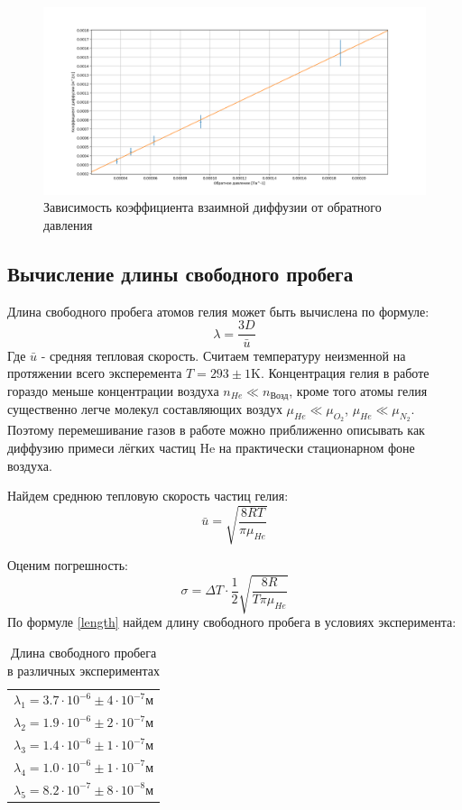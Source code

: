 \documentclass{article}
\begin{document}
\begin{figure}[h]
\centering
    \includegraphics[scale = 0.3]{DbyinversedPressure.png}
    \caption{Зависимость коэффициента взаимной диффузии от обратного давления}
    \label{Dbyinversed Pressure}
\end{figure}
\subsection{Вычисление длины свободного пробега}
Длина свободного пробега атомов гелия может быть вычислена по формуле:
\begin{equation}\label{length}
\lambda = \frac{3 D}{\bar{u}}
\end{equation}
Где $\bar{u}$ - средняя тепловая скорость. Считаем температуру неизменной на протяжении всего эксперемента $T = 293 \pm 1 \text{K}$. Концентрация гелия в работе гораздо меньше концентрации воздуха $n_{He} \ll n_{\text{Возд}} $, кроме того атомы гелия существенно легче молекул составляющих воздух $\mu_{He} \ll \mu_{O_2}$, $\mu_{He} \ll \mu_{N_2}$. Поэтому перемешивание газов в работе можно приближенно описывать как диффузию примеси лёгких частиц He на практически стационарном фоне воздуха.

Найдем среднюю тепловую скорость частиц гелия:
\begin{equation*}
    \bar{u} = \sqrt{\frac{8 R T}{\pi \mu_{He}}}
\end{equation*}

Оценим погрешность:
\begin{equation*}
    \sigma = \Delta{T} \cdot \frac{1}{2}  \sqrt{\frac{8 R}{T \pi \mu_{He}}}
\end{equation*}
\newpage
По формуле \eqref{length} найдем длину свободного пробега в условиях эксперимента:
\begin{table}[h]
    \centering
    \begin{tabular}{l}
         $\lambda_{1} = 3.7 \cdot 10^{-6} \pm 4 \cdot 10^{-7} \text{м}$ \\
         $\lambda_{2} = 1.9 \cdot 10^{-6} \pm 2 \cdot 10^{-7} \text{м}$ \\
          $\lambda_{3} = 1.4 \cdot 10^{-6} \pm 1 \cdot 10^{-7} \text{м}$ \\
           $\lambda_{4} = 1.0 \cdot 10^{-6} \pm 1 \cdot 10^{-7} \text{м}$ \\
            $\lambda_{5} = 8.2 \cdot 10^{-7} \pm 8 \cdot 10^{-8} \text{м}$ \\
    \end{tabular}
    \caption{Длина свободного пробега в различных экспериментах}
    \label{lal}
\end{table}
\end{document}
